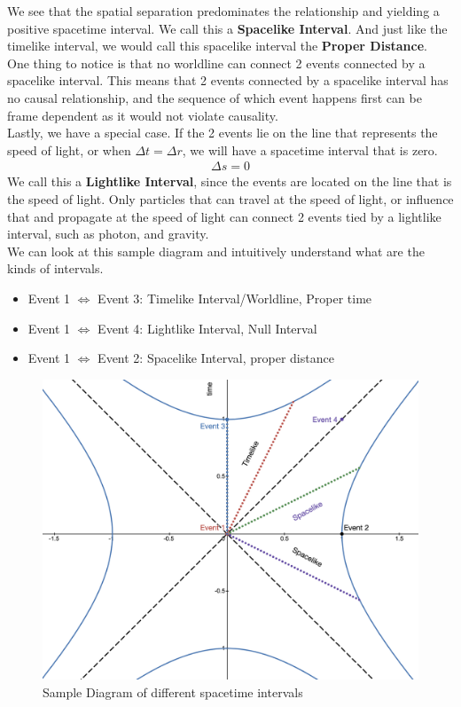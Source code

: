 \documentclass[12pt]{book}
\begin{document}
We see that the spatial separation predominates the relationship and yielding a positive spacetime interval. We call this a \textbf{Spacelike Interval}. And just like the timelike interval, we would call this spacelike interval the \textbf{Proper Distance}.\\
\newline
One thing to notice is that no worldline can connect 2 events connected by a spacelike interval. This means that 2 events connected by a spacelike interval has no causal relationship, and the sequence of which event happens first can be frame dependent as it would not violate causality.\\
\newline
Lastly, we have a special case. If the 2 events lie on the line that represents the speed of light, or when $\Delta t = \Delta r$, we will have a spacetime interval that is zero.
\begin{align}
\Delta s = 0
\end{align}
We call this a \textbf{Lightlike Interval}, since the events are located on the line that is the speed of light. Only particles that can travel at the speed of light, or influence that and propagate at the speed of light can connect 2 events tied by a lightlike interval, such as photon, and gravity. \\
\newline 
We can look at this sample diagram and intuitively understand what are the kinds of intervals. \\

\begin{itemize}
    \item Event 1 $\iff$ Event 3: Timelike Interval/Worldline, Proper time
    \item Event 1 $\iff$ Event 4: Lightlike Interval, Null Interval
    \item Event 1 $\iff$ Event 2: Spacelike Interval, proper distance 
\end{itemize}

\begin{figure}[!h]
    \centering
    \includegraphics[width=0.5\linewidth]{picture/Spacetime diagram .png}
    \caption{Sample Diagram of different spacetime intervals}
    \label{fig:spacetime diagram}
\end{figure}
\end{document}
